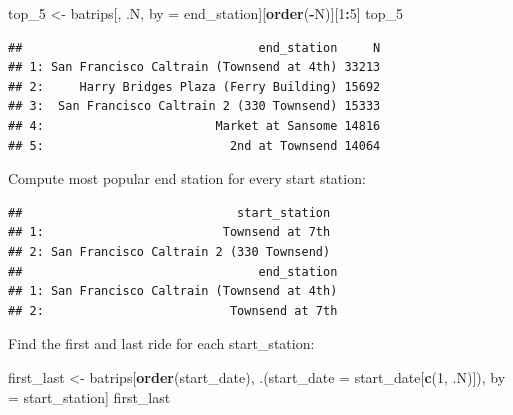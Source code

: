 \documentclass[]{book}
\newenvironment{Shaded}{\begin{snugshade}}{\end{snugshade}}
\newcommand{\DataTypeTok}[1]{\textcolor[rgb]{0.13,0.29,0.53}{#1}}
\newcommand{\DecValTok}[1]{\textcolor[rgb]{0.00,0.00,0.81}{#1}}
\newcommand{\KeywordTok}[1]{\textcolor[rgb]{0.13,0.29,0.53}{\textbf{#1}}}
\newcommand{\NormalTok}[1]{#1}
\newcommand{\OperatorTok}[1]{\textcolor[rgb]{0.81,0.36,0.00}{\textbf{#1}}}
\newcommand{\StringTok}[1]{\textcolor[rgb]{0.31,0.60,0.02}{#1}}
\begin{document}
\begin{Shaded}
\begin{Highlighting}[]
\NormalTok{top_}\DecValTok{5}\NormalTok{ <-}\StringTok{ }\NormalTok{batrips[, .N, by =}\StringTok{ }\NormalTok{end_station][}\KeywordTok{order}\NormalTok{(}\OperatorTok{-}\NormalTok{N)][}\DecValTok{1}\OperatorTok{:}\DecValTok{5}\NormalTok{]}
\NormalTok{top_}\DecValTok{5}
\end{Highlighting}
\end{Shaded}

\begin{verbatim}
##                                 end_station     N
## 1: San Francisco Caltrain (Townsend at 4th) 33213
## 2:     Harry Bridges Plaza (Ferry Building) 15692
## 3:  San Francisco Caltrain 2 (330 Townsend) 15333
## 4:                        Market at Sansome 14816
## 5:                          2nd at Townsend 14064
\end{verbatim}

Compute most popular end station for every start station:

\begin{Shaded}
\end{Shaded}

\begin{verbatim}
##                              start_station
## 1:                         Townsend at 7th
## 2: San Francisco Caltrain 2 (330 Townsend)
##                                 end_station
## 1: San Francisco Caltrain (Townsend at 4th)
## 2:                          Townsend at 7th
\end{verbatim}

Find the first and last ride for each start\_station:

\begin{Shaded}
\begin{Highlighting}[]
\NormalTok{first_last <-}\StringTok{ }\NormalTok{batrips[}\KeywordTok{order}\NormalTok{(start_date), }
\NormalTok{                      .(}\DataTypeTok{start_date =}\NormalTok{ start_date[}\KeywordTok{c}\NormalTok{(}\DecValTok{1}\NormalTok{, .N)]), }
\NormalTok{                      by =}\StringTok{ }\NormalTok{start_station]}
\NormalTok{first_last}
\end{Highlighting}
\end{Shaded}
\end{document}
